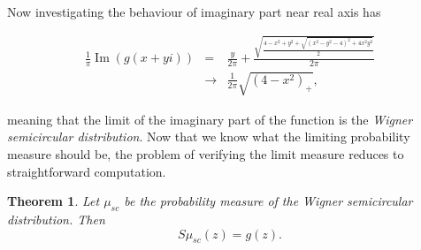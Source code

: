 \documentclass[12pt,a4paper,leqno]{report}
\renewcommand{\Im}{\operatorname{Im}}
\theoremstyle{plain}
\newtheorem{theo}[equation]{Theorem}
\theoremstyle{definition}
\theoremstyle{remark}
\begin{document}
Now investigating the behaviour of imaginary part near real axis has

\begin{eqnarray*}
\frac{1}{\pi} \Im(g(x+yi)) & = &
\frac{y}{2\pi} + \frac{\sqrt{\frac{4-x^2+y^2+\sqrt{(x^2-y^2-4)^2+4x^2y^2}}{2}}}{2\pi}\\
& \to & \frac{1}{2\pi} \sqrt{(4-x^2)_+},
\end{eqnarray*}

meaning that the limit of the imaginary part of the function is the \emph{Wigner semicircular distribution}. Now that we know what the limiting probability measure should be, the problem of verifying the limit measure reduces to straightforward computation.

\begin{theo}
Let $\mu_{sc}$ be the probability measure of the Wigner semicircular distribution. Then
\begin{equation*}
S\mu_{sc}(z) = g(z).
\end{equation*}
\end{theo}
\end{document}
